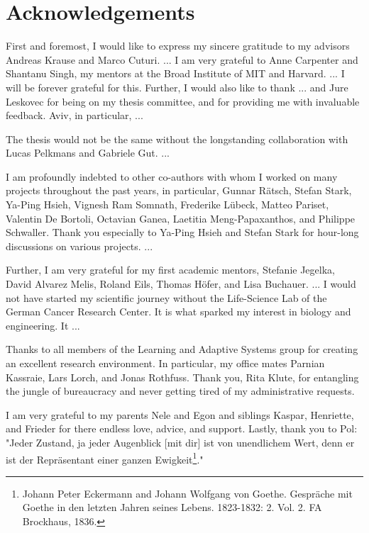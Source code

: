 
\bigskip

\begingroup
\let\clearpage\relax
\let\cleardoublepage\relax
\let\cleardoublepage\relax
\chapter*{Acknowledgements}

\def\thanks#1{%
\begingroup
\leftskip1em
\noindent #1
\par
\endgroup
}

First and foremost, I would like to express my sincere gratitude to my advisors Andreas Krause and Marco Cuturi.
...
I am very grateful to Anne Carpenter and Shantanu Singh, my mentors at the Broad Institute of MIT and Harvard. ... I will be forever grateful for this.
Further, I would also like to thank ... and Jure Leskovec for being on my thesis committee, and for providing me with invaluable feedback.
Aviv, in particular, ...

The thesis would not be the same without the longstanding collaboration with Lucas Pelkmans and Gabriele Gut. ...

I am profoundly indebted to other co-authors with whom I worked on many projects throughout the past years, in particular, Gunnar R\"atsch, Stefan Stark, Ya-Ping Hsieh, Vignesh Ram Somnath, Frederike L\"ubeck, Matteo Pariset, Valentin De Bortoli, Octavian Ganea, Laetitia Meng-Papaxanthos, and Philippe Schwaller. Thank you especially to Ya-Ping Hsieh and Stefan Stark for hour-long discussions on various projects. 
...

Further, I am very grateful for my first academic mentors, Stefanie Jegelka, David Alvarez Melis, Roland Eils, Thomas H\"ofer, and Lisa Buchauer. ...
I would not have started my scientific journey without the Life-Science Lab of the German Cancer Research Center. It is what sparked my interest in biology and engineering. It ...

Thanks to all members of the Learning and Adaptive Systems group for creating an excellent research environment. In particular, my office mates Parnian Kassraie, Lars Lorch, and Jonas Rothfuss. Thank you, Rita Klute, for entangling the jungle of bureaucracy and never getting tired of my administrative requests. 

I am very grateful to my parents Nele and Egon and siblings Kaspar, Henriette, and Frieder for there endless love, advice, and support.
Lastly, thank you to Pol: "Jeder Zustand, ja jeder Augenblick [mit dir] ist von unendlichem Wert, denn er ist der Repr{\"a}sentant einer ganzen Ewigkeit\footnote{Johann Peter Eckermann and Johann Wolfgang von Goethe. Gespr{\"a}che mit Goethe in den letzten Jahren seines Lebens. 1823-1832: 2. Vol. 2. FA Brockhaus, 1836.}."


\endgroup

